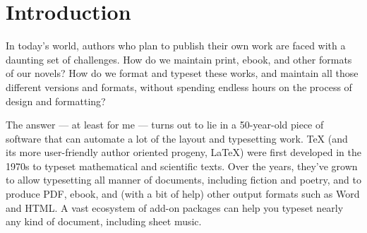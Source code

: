 %
%
%
%
%
%
%
%
%
%

\chapter{Introduction} \label{chap:introduction}

In today's world, authors who plan to publish their own work are faced with a
daunting set of challenges. How do we maintain print, ebook, and other formats
of our novels? How do we format and typeset these works, and maintain all
those different versions and formats, without spending endless hours on the
process of design and formatting?

The answer --- at least for me --- turns out to lie in a 50-year-old piece of
software that can automate a lot of the layout and typesetting work. \TeX{} (and
its more user-friendly author oriented progeny, \LaTeX) were first developed
in the 1970s to typeset mathematical and scientific texts. Over the years,
they've grown to allow typesetting all manner of documents, including fiction
and poetry, and to produce PDF, ebook, and (with a bit of help) other output
formats such as Word and HTML. A vast ecosystem of add-on packages can help
you typeset nearly any kind of document, including sheet music.

